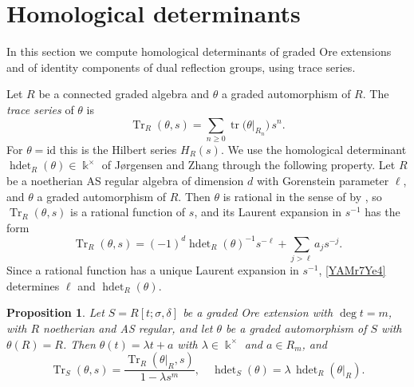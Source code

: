 \documentclass[reqno]{amsart}
\numberwithin{equation}{section}
\newtheorem{proposition}[equation]{Proposition}
\theoremstyle{definition}
\theoremstyle{remark}
\theoremstyle{plain}
\newcommand{\kk}{\Bbbk}
\DeclareMathOperator{\hdet}{hdet}
\DeclareMathOperator{\Tr}{Tr}
\DeclareMathOperator{\tr}{tr}
\begin{document}
\section{Homological determinants}\label{YAMs7Hd0}

In this section we compute homological determinants of graded Ore extensions and of identity components of dual reflection groups, using trace series.

Let $R$ be a connected graded algebra and $\theta$ a graded automorphism of $R$. The \emph{trace series} of $\theta$ is
\[
\Tr_R(\theta,s)=\sum_{n\ge0}\tr\big(\theta|_{R_n}\big)\,s^n.
\]
For $\theta=\mathrm{id}$ this is the Hilbert series $H_R(s)$. We use the homological determinant $\hdet_R(\theta)\in\kk^\times$ of J{\o}rgensen and Zhang \cite{JZ} through the following property. Let $R$ be a noetherian AS regular algebra of dimension $d$ with Gorenstein parameter $\ell$, and $\theta$ a graded automorphism of $R$. Then $\theta$ is rational in the sense of \cite[1.3]{JZ} by \cite[4.2]{JZ}, so $\Tr_R(\theta,s)$ is a rational function of $s$, and its Laurent expansion in $s^{-1}$ has the form \cite[Lemma 2.6]{JZ}
\begin{equation}\label{YAMr7Ye4}
\Tr_R(\theta,s)=(-1)^d\hdet_R(\theta)^{-1}s^{-\ell}+\sum_{j>\ell}a_js^{-j}.
\end{equation}
Since a rational function has a unique Laurent expansion in $s^{-1}$, \eqref{YAMr7Ye4} determines $\ell$ and $\hdet_R(\theta)$.

\begin{proposition}\label{YAMhd2Ow5}
Let $S=R[t;\sigma,\delta]$ be a graded Ore extension with $\deg t=m$, with $R$ noetherian and AS regular, and let $\theta$ be a graded automorphism of $S$ with $\theta(R)=R$. Then $\theta(t)=\lambda t+a$ with $\lambda\in\kk^\times$ and $a\in R_m$, and
\begin{equation}\label{YAMe48Hd4}
\Tr_S(\theta,s)=\frac{\Tr_R(\theta|_R,s)}{1-\lambda s^m},\quad\hdet_S(\theta)=\lambda\,\hdet_R(\theta|_R).
\end{equation}
\end{proposition}
\end{document}
